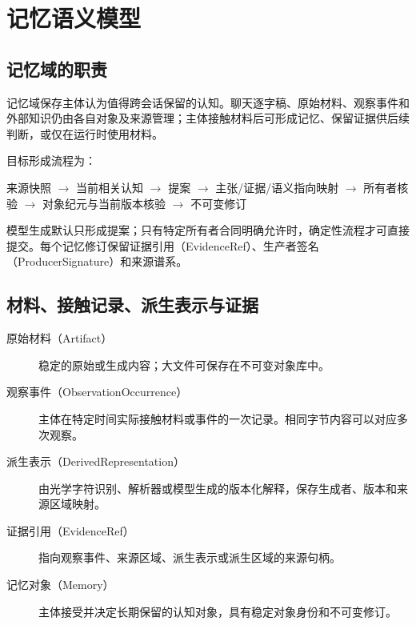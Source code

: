 \chapter{记忆语义模型}

\section{记忆域的职责}

记忆域保存主体认为值得跨会话保留的认知。聊天逐字稿、原始材料、观察事件和外部知识仍由各自对象及来源管理；主体接触材料后可形成记忆、保留证据供后续判断，或仅在运行时使用材料。\cite{nous-research-package}

目标形成流程为：

\begin{center}
\small
来源快照 $\rightarrow$ 当前相关认知 $\rightarrow$ 提案 $\rightarrow$ 主张/证据/语义指向映射 $\rightarrow$ 所有者核验 $\rightarrow$ 对象纪元与当前版本核验 $\rightarrow$ 不可变修订
\end{center}

模型生成默认只形成提案；只有特定所有者合同明确允许时，确定性流程才可直接提交。每个记忆修订保留证据引用（EvidenceRef）、生产者签名（ProducerSignature）和来源谱系。

\section{材料、接触记录、派生表示与证据}

\begin{description}
\item[原始材料（Artifact）] 稳定的原始或生成内容；大文件可保存在不可变对象库中。
\item[观察事件（ObservationOccurrence）] 主体在特定时间实际接触材料或事件的一次记录。相同字节内容可以对应多次观察。
\item[派生表示（DerivedRepresentation）] 由光学字符识别、解析器或模型生成的版本化解释，保存生成者、版本和来源区域映射。
\item[证据引用（EvidenceRef）] 指向观察事件、来源区域、派生表示或派生区域的来源句柄。
\item[记忆对象（Memory）] 主体接受并决定长期保留的认知对象，具有稳定对象身份和不可变修订。
\end{description}

